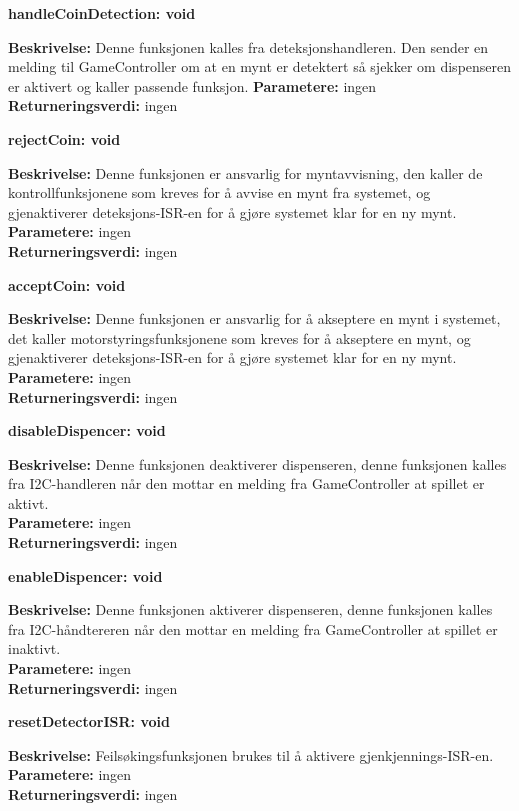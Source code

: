 \documentclass[Arkitektur/System_main.tex]{subfiles}
\begin{document}
\textbf {handleCoinDetection: void}
\begin{adjustwidth}{1cm}{0pt}
\textbf {Beskrivelse:} Denne funksjonen kalles fra deteksjonshandleren. Den sender en melding til GameController om at en mynt er detektert så sjekker om dispenseren er aktivert og kaller passende funksjon.
\textbf {Parametere:} ingen \\ [0.2cm]
\textbf {Returneringsverdi:} ingen \\ [0.2cm]
\end{adjustwidth}

\textbf {rejectCoin: void}
\begin{adjustwidth}{1cm}{0pt}
\textbf {Beskrivelse:} Denne funksjonen er ansvarlig for myntavvisning, den kaller de kontrollfunksjonene som kreves for å avvise en mynt fra systemet, og gjenaktiverer deteksjons-ISR-en for å gjøre systemet klar for en ny mynt. \\ [0.2cm]
\textbf {Parametere:} ingen \\ [0.2cm]
\textbf {Returneringsverdi:} ingen \\ [0.2cm]
\end{adjustwidth}

\textbf {acceptCoin: void}
\begin{adjustwidth}{1cm}{0pt}
\textbf {Beskrivelse:} Denne funksjonen er ansvarlig for å akseptere en mynt i systemet, det kaller motorstyringsfunksjonene som kreves for å akseptere en mynt, og gjenaktiverer deteksjons-ISR-en for å gjøre systemet klar for en ny mynt. \\ [0.2cm]
\textbf {Parametere:} ingen \\ [0.2cm]
\textbf {Returneringsverdi:} ingen \\ [0.2cm]
\end{adjustwidth}

\textbf {disableDispencer: void}
\begin{adjustwidth}{1cm}{0pt}
\textbf {Beskrivelse:} Denne funksjonen deaktiverer dispenseren, denne funksjonen kalles fra I2C-handleren når den mottar en melding fra GameController at spillet er aktivt. \\ [0.2cm]
\textbf {Parametere:} ingen \\ [0.2cm]
\textbf {Returneringsverdi:} ingen \\ [0.2cm]
\end{adjustwidth}

\textbf {enableDispencer: void}
\begin{adjustwidth}{1cm}{0pt}
\textbf {Beskrivelse:} Denne funksjonen aktiverer dispenseren, denne funksjonen kalles fra I2C-håndtereren når den mottar en melding fra GameController at spillet er inaktivt. \\ [0.2cm]
\textbf {Parametere:} ingen \\ [0.2cm]
\textbf {Returneringsverdi:} ingen \\ [0.2cm]
\end{adjustwidth}

\textbf {resetDetectorISR: void}
\begin{adjustwidth}{1cm}{0pt}
\textbf {Beskrivelse:} Feilsøkingsfunksjonen brukes til å aktivere gjenkjennings-ISR-en. \\ [0.2cm]
\textbf {Parametere:} ingen \\ [0.2cm]
\textbf {Returneringsverdi:} ingen \\ [0.2cm]
\end{adjustwidth}
\end{document}
